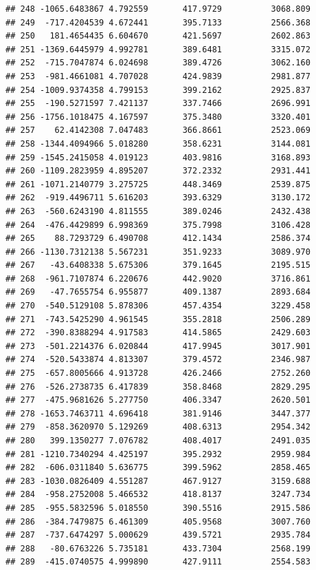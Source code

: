 \documentclass[
]{article}
\begin{document}
\begin{verbatim}
## 248 -1065.6483867 4.792559       417.9729          3068.809
## 249  -717.4204539 4.672441       395.7133          2566.368
## 250   181.4654435 6.604670       421.5697          2602.863
## 251 -1369.6445979 4.992781       389.6481          3315.072
## 252  -715.7047874 6.024698       389.4726          3062.160
## 253  -981.4661081 4.707028       424.9839          2981.877
## 254 -1009.9374358 4.799153       399.2162          2925.837
## 255  -190.5271597 7.421137       337.7466          2696.991
## 256 -1756.1018475 4.167597       375.3480          3320.401
## 257    62.4142308 7.047483       366.8661          2523.069
## 258 -1344.4094966 5.018280       358.6231          3144.081
## 259 -1545.2415058 4.019123       403.9816          3168.893
## 260 -1109.2823959 4.895207       372.2332          2931.441
## 261 -1071.2140779 3.275725       448.3469          2539.875
## 262  -919.4496711 5.616203       393.6329          3130.172
## 263  -560.6243190 4.811555       389.0246          2432.438
## 264  -476.4429899 6.998369       375.7998          3106.428
## 265    88.7293729 6.490708       412.1434          2586.374
## 266 -1130.7312138 5.567231       351.9233          3089.970
## 267   -43.6408338 5.675306       379.1645          2195.515
## 268  -961.7107874 6.220676       442.9020          3716.861
## 269   -47.7655754 6.955877       409.1387          2893.684
## 270  -540.5129108 5.878306       457.4354          3229.458
## 271  -743.5425290 4.961545       355.2818          2506.289
## 272  -390.8388294 4.917583       414.5865          2429.603
## 273  -501.2214376 6.020844       417.9945          3017.901
## 274  -520.5433874 4.813307       379.4572          2346.987
## 275  -657.8005666 4.913728       426.2466          2752.260
## 276  -526.2738735 6.417839       358.8468          2829.295
## 277  -475.9681626 5.277750       406.3347          2620.501
## 278 -1653.7463711 4.696418       381.9146          3447.377
## 279  -858.3620970 5.129269       408.6313          2954.342
## 280   399.1350277 7.076782       408.4017          2491.035
## 281 -1210.7340294 4.425197       395.2932          2959.984
## 282  -606.0311840 5.636775       399.5962          2858.465
## 283 -1030.0826409 4.551287       467.9127          3159.688
## 284  -958.2752008 5.466532       418.8137          3247.734
## 285  -955.5832596 5.018550       390.5516          2915.586
## 286  -384.7479875 6.461309       405.9568          3007.760
## 287  -737.6474297 5.000629       439.5721          2935.784
## 288   -80.6763226 5.735181       433.7304          2568.199
## 289  -415.0740575 4.999890       427.9111          2554.583

\end{verbatim}
\end{document}
